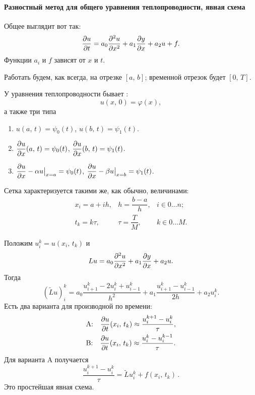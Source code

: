 \documentclass{trlnotes}
\begin{document}
\paragraph{Разностный метод для общего уравнения теплопроводности, явная схема}

\begin{de}
	Общее  выглядит вот так:
	\[
		\dfrac{\partial u}{\partial t} = a_0 \dfrac{\partial^2 u}{\partial x^2} + a_1 \dfrac{\partial y}{\partial x} + a_2 u + f.
	\]
	Функции $a_i$ и $f$ зависят от $x$ и $t$.
\end{de}

Работать будем, как всегда, на отрезке $[a, \, b]$; временной отрезок будет $[0, \, T]$.

\begin{de}
	У уравнения теплопроводности бывает :
	\[
		u(x, \, 0) = \varphi(x),            
	\]
	а также три типа 
	\begin{enumerate}
		\item $u(a, \, t) = \psi_0(t)$, $u(b, \, t) = \psi_1(t)$.
		\item $\dfrac{\partial u}{\partial x}(a, \, t) = \psi_0(t)$, $\dfrac{\partial u}{\partial x}(b, \, t) = \psi_1(t)$.
		\item $\dfrac{\partial u}{\partial x} - \alpha u \big|_{x = a} = \psi_0(t)$, $\dfrac{\partial u}{\partial x} - \beta u \big|_{x = b} = \psi_1(t)$.
	\end{enumerate}
\end{de}
Сетка характеризуется такими же, как обычно, величинами:
\[
	\begin{array}{lll}
		x_i = a + ih, & h = \dfrac{b - a}{h}, & i \in 0\ldots n; \\
		t_k = k\tau, & \tau = \dfrac{T}{M}, & k \in 0 \ldots M.
	\end{array}
\]

Положим $u_i^k = u(x_i, \, t_k)$ и
\[
	Lu = a_0 \dfrac{\partial^2 u}{\partial x^2} + a_1 \dfrac{\partial y}{\partial x} + a_2 u.
\]
Тогда
\[
	(\tilde{L}u)_i^k = a_0 \dfrac{u_{i+1}^k - 2u_i^k + u_{i - 1}^k}{h^2} + a_1 \dfrac{u_{i + 1}^k - u_{i - 1}^k}{2h} + a_2 u_i^k.
\]
Есть два варианта для производной по времени:
\begin{align}\label{eq:therm-A-B}
				&\text{A:} \quad \dfrac{\partial u}{\partial t}(x_i, \, t_k) \approx \dfrac{u^{k + 1}_i - u^k_i}{\tau}, \\
				&\text{B:} \quad \dfrac{\partial u}{\partial t}(x_i, \, t_k) \approx \dfrac{u^{k}_i - u^{k-1}_i}{\tau}.
\end{align}
Для варианта A получается 
\[
	\boxed{\dfrac{u_i^{k + 1} - u_i^k}{\tau} = \tilde{L}u_i^k + f(x_i, \, t_k)}\,.
\]
Это простейшая явная схема. 
\end{document}
